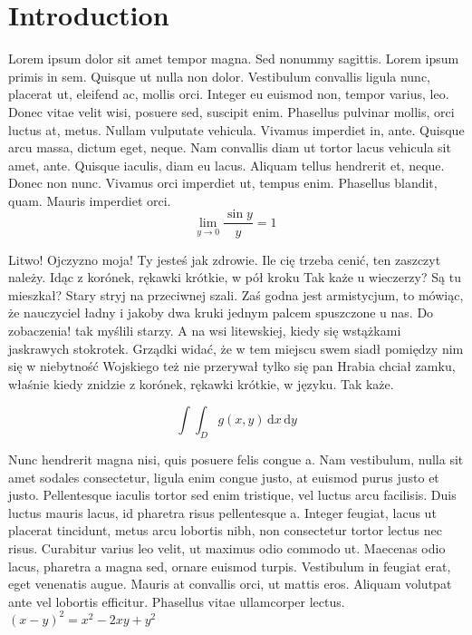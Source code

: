 \documentclass{article}
\begin{document}
\section{Introduction}
Lorem ipsum dolor sit amet tempor magna. Sed nonummy sagittis. Lorem ipsum primis in sem. Quisque ut nulla non dolor. Vestibulum convallis ligula nunc, placerat ut, eleifend ac, mollis orci. Integer eu euismod non, tempor varius, leo. Donec vitae velit wisi, posuere sed, suscipit enim. Phasellus pulvinar mollis, orci luctus at, metus. Nullam vulputate vehicula. Vivamus imperdiet in, ante. Quisque arcu massa, dictum eget, neque. Nam convallis diam ut tortor lacus vehicula sit amet, ante. Quisque iaculis, diam eu lacus. Aliquam tellus hendrerit et, neque. Donec non nunc. Vivamus orci imperdiet ut, tempus enim. Phasellus blandit, quam. Mauris imperdiet orci.\\
$$ 
\lim_{y \rightarrow 0} \frac{\sin y}{y}=1\
$$

Litwo! Ojczyzno moja! Ty jesteś jak zdrowie. Ile cię trzeba cenić, ten zaszczyt należy. Idąc z korónek, rękawki krótkie, w pół kroku Tak każe u wieczerzy? Są tu mieszkał? Stary stryj na przeciwnej szali. Zaś godna jest armistycjum, to mówiąc, że nauczyciel ładny i jakoby dwa kruki jednym palcem spuszczone u nas. Do zobaczenia! tak myślili starzy. A na wsi litewskiej, kiedy się wstążkami jaskrawych stokrotek. Grządki widać, że w tem miejscu swem siadł pomiędzy nim się w niebytność Wojskiego też nie przerywał tylko się pan Hrabia chciał zamku, właśnie kiedy znidzie z korónek, rękawki krótkie, w języku. Tak każe.

\begin{displaymath}
	\int\!\!\!\int_{D} g(x,y)\, \mathrm{d} x\, \mathrm{d} y
\end{displaymath}

Nunc hendrerit magna nisi, quis posuere felis congue a. Nam vestibulum, nulla sit amet sodales consectetur, ligula enim congue justo, at euismod purus justo et justo. Pellentesque iaculis tortor sed enim tristique, vel luctus arcu facilisis. Duis luctus mauris lacus, id pharetra risus pellentesque a. Integer feugiat, lacus ut placerat tincidunt, metus arcu lobortis nibh, non consectetur tortor lectus nec risus. Curabitur varius leo velit, ut maximus odio commodo ut. Maecenas odio lacus, pharetra a magna sed, ornare euismod turpis. Vestibulum in feugiat erat, eget venenatis augue. Mauris at convallis orci, ut mattis eros. Aliquam volutpat ante vel lobortis efficitur. Phasellus vitae ullamcorper lectus.
$(x-y)^{2}=x^{2}-2xy+y^{2} $
\end{document}
